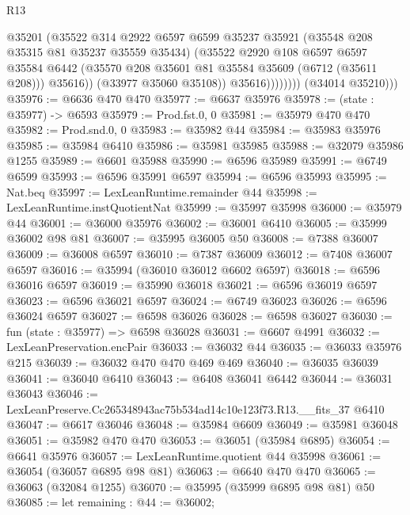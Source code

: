 \begin{lexlean}{R13}
\begin{coremodule}
                          @35201
                          (@35522
                            @314
                            @2922
                            @6597
                            @6599
                            @35237
                            @35921
                            (@35548 @208 @35315 @81 @35237 @35559 @35434)
                            (@35522
                              @2920
                              @108
                              @6597
                              @6597
                              @35584
                              @6442
                              (@35570 @208 @35601 @81 @35584 @35609 (@6712 (@35611 @208)))
                              @35616))
                          (@33977 @35060 @35108))
                        @35616))))))))
        (@34014 @35210)))
@35976 := @6636 @470 @470
@35977 := @6637 @35976
@35978 := (state : @35977) -> @6593
@35979 := Prod.fst.{0, 0}
@35981 := @35979 @470 @470
@35982 := Prod.snd.{0, 0}
@35983 := @35982 @44
@35984 := @35983 @35976
@35985 := @35984 @6410
@35986 := @35981 @35985
@35988 := @32079 @35986 @1255
@35989 := @6601 @35988
@35990 := @6596 @35989
@35991 := @6749 @6599
@35993 := @6596 @35991 @6597
@35994 := @6596 @35993
@35995 := Nat.beq
@35997 := LexLeanRuntime.remainder @44
@35998 := LexLeanRuntime.instQuotientNat
@35999 := @35997 @35998
@36000 := @35979 @44
@36001 := @36000 @35976
@36002 := @36001 @6410
@36005 := @35999 @36002 @98 @81
@36007 := @35995 @36005 @50
@36008 := @7388 @36007
@36009 := @36008 @6597
@36010 := @7387 @36009
@36012 := @7408 @36007 @6597
@36016 := @35994 (@36010 @36012 @6602 @6597)
@36018 := @6596 @36016 @6597
@36019 := @35990 @36018
@36021 := @6596 @36019 @6597
@36023 := @6596 @36021 @6597
@36024 := @6749 @36023
@36026 := @6596 @36024 @6597
@36027 := @6598 @36026
@36028 := @6598 @36027
@36030 := fun (state : @35977) => @6598 @36028
@36031 := @6607 @4991
@36032 := LexLeanPreservation.encPair
@36033 := @36032 @44
@36035 := @36033 @35976 @215
@36039 := @36032 @470 @470 @469 @469
@36040 := @36035 @36039
@36041 := @36040 @6410
@36043 := @6408 @36041 @6442
@36044 := @36031 @36043
@36046 := LexLeanPreserve.Cc265348943ac75b534ad14c10e123f73.R13.__fits_37 @6410
@36047 := @6617 @36046
@36048 := @35984 @6609
@36049 := @35981 @36048
@36051 := @35982 @470 @470
@36053 := @36051 (@35984 @6895)
@36054 := @6641 @35976
@36057 := LexLeanRuntime.quotient @44 @35998
@36061 := @36054 (@36057 @6895 @98 @81)
@36063 := @6640 @470 @470
@36065 := @36063 (@32084 @1255)
@36070 := @35995 (@35999 @6895 @98 @81) @50
@36085 := let remaining : @44 := @36002;

\end{coremodule}
\end{lexlean}
